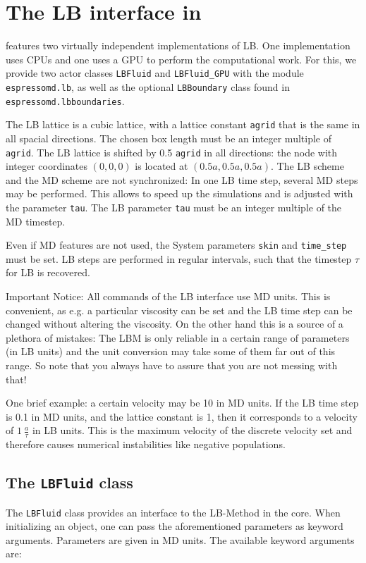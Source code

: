 

\section{The LB interface in \ES{}}
\ES{} features two virtually independent implementations of LB. One implementation
uses CPUs and one uses a GPU to perform the computational work. For this, we
provide two actor classes \texttt{LBFluid} and \texttt{LBFluid\_GPU} with the
module \texttt{espressomd.lb}, as well as the optional \texttt{LBBoundary} class
found in \texttt{espressomd.lbboundaries}.

The LB lattice is a cubic lattice, with a lattice constant \texttt{agrid} that
is the same in all spacial directions. The chosen box length must be an integer multiple
of \texttt{agrid}. The LB lattice is shifted by 0.5 \texttt{agrid} in all directions: the node
with integer coordinates $\left(0,0,0\right)$ is located at
$\left(0.5a,0.5a,0.5a\right)$.
The LB scheme and the MD scheme are not synchronized: In one
LB time step, several MD steps may be performed. This allows to speed
up the simulations and is adjusted with the parameter \texttt{tau}.
The LB parameter \texttt{tau} must be an integer multiple of the MD timestep.

Even if MD features are not used, the System parameters \texttt{skin} and
\texttt{time\_step} must be set. LB steps are performed 
in regular intervals, such that the timestep $\tau$ for LB is recovered. 

Important Notice: All commands of the LB interface use
MD units. This is convenient, as e.g. a particular 
viscosity can be set and the LB time step can be changed without
altering the viscosity. On the other hand this is a source
of a plethora of mistakes: The LBM is only reliable in a certain 
range of parameters (in LB units) and the unit conversion
may take some of them far out of this range. So note that you always
have to assure that you are not messing with that!

One brief example: a certain velocity may be 10 in MD units.
If the LB time step is 0.1 in MD units, and the lattice constant
is 1, then it corresponds to a velocity of $1\ \frac{a}{\tau}$ in LB units.
This is the maximum velocity of the discrete velocity set and therefore
causes numerical instabilities like negative populations.

\subsection*{The \texttt{LBFluid} class}
The \texttt{LBFluid} class provides an interface to the LB-Method in the \ES{}
core. When initializing an object, one can pass the aforementioned parameters
as keyword arguments. Parameters are given in MD units. The available keyword
arguments are:



